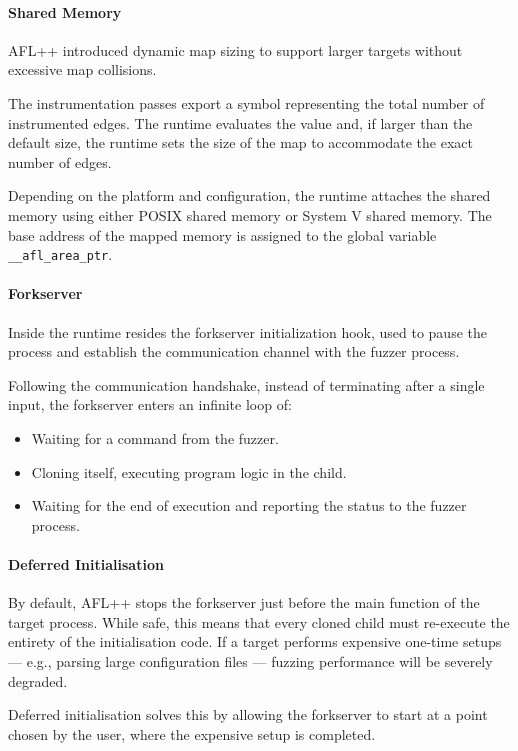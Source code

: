 \paragraph{Shared Memory} AFL++ introduced dynamic map sizing to support larger targets without excessive map collisions. 

The instrumentation passes export a symbol representing the total number of instrumented edges. The runtime evaluates the value and, if larger than the default size, the runtime sets the size of the map to accommodate the exact number of edges.

Depending on the platform and configuration, the runtime attaches the shared memory using either POSIX shared memory or System V shared memory. The base address of the mapped memory is assigned to the global variable \texttt{\_\_afl\_area\_ptr}.

\paragraph{Forkserver} Inside the runtime resides the forkserver initialization hook, used to pause the process and establish the communication channel with the fuzzer process. 

Following the communication handshake, instead of terminating after a single input, the forkserver enters an infinite loop of:
\begin{itemize}
    \item Waiting for a command from the fuzzer.

    \item Cloning itself, executing program logic in the child.

    \item Waiting for the end of execution and reporting the status to the fuzzer process.
\end{itemize}

\paragraph{Deferred Initialisation} By default, AFL++ stops the forkserver just before the main function of the target process. While safe, this means that every cloned child must re-execute the entirety of the initialisation code. If a target performs expensive one-time setups --- e.g., parsing large configuration files --- fuzzing performance will be severely degraded.

Deferred initialisation solves this by allowing the forkserver to start at a point chosen by the user, where the expensive setup is completed.

